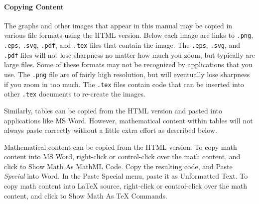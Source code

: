 \documentclass[12pt,]{book}
\theoremstyle{plain}
\theoremstyle{definition}
\theoremstyle{definition}
\theoremstyle{definition}
\theoremstyle{definition}
\theoremstyle{definition}
\numberwithin{equation}{section}
\begin{document}
\paragraph[{Copying Content}]{Copying Content}\hypertarget{paragraphs-2}{}
The graphs and other images that appear in this manual may be copied in various file formats using the HTML version. Below each image are links to \lstinline?.png?, \lstinline?.eps?, \lstinline?.svg?, \lstinline?.pdf?, and \lstinline?.tex? files that contain the image. The \lstinline?.eps?, \lstinline?.svg?, and \lstinline?.pdf? files will not lose sharpness no matter how much you zoom, but typically are large files. Some of these formats may not be recognized by applications that you use. The \lstinline?.png? file are of fairly high resolution, but will eventually lose sharpness if you zoom in too much. The \lstinline?.tex? files contain code that can be inserted into other \lstinline?.tex? documents to re-create the images.%
\par
Similarly, tables can be copied from the HTML version and pasted into applications like MS Word. However, mathematical content within tables will not always paste correctly without a little extra effort as described below.%
\par
Mathematical content can be copied from the HTML version. To copy math content into MS Word, right-click or control-click over the math content, and click to Show Math As MathML Code. Copy the resulting code, and Paste \emph{Special} into Word. In the Paste Special menu, paste it as Unformatted Text. To copy math content into \LaTeX{} source, right-click or control-click over the math content, and click to Show Math As TeX Commands.%
\typeout{************************************************}
\typeout{************************************************}
\end{document}
